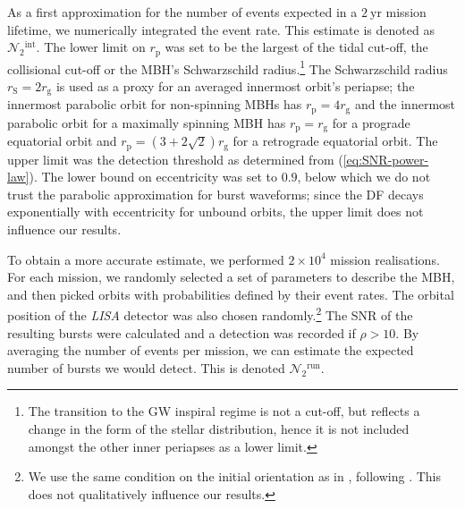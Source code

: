 \documentclass[useAMS,usedcolumn,usegraphicx,usenatbib]{mn2e}
\newcommand{\eqnref}[1]{(\ref{eq:#1})}
\newcommand{\units}[1]{\ensuremath{~\mathrm{#1}}}
\newcommand{\sub}[1]{\ensuremath{_\mathrm{#1}}}
\newcommand{\super}[1]{\ensuremath{^\mathrm{#1}}}
\begin{document}
As a first approximation for the number of events expected in a $2\units{yr}$ mission lifetime, we numerically integrated the event rate. This estimate is denoted as $\mathcal{N}_2\super{int}$. The lower limit on $r\sub{p}$ was set to be the largest of the tidal cut-off, the collisional cut-off or the MBH's Schwarzschild radius.\footnote{The transition to the GW inspiral regime is not a cut-off, but reflects a change in the form of the stellar distribution, hence it is not included amongst the other inner periapses as a lower limit.} The Schwarzschild radius $r\sub{S} = 2 r\sub{g}$ is used as a proxy for an averaged innermost orbit's periapse; the innermost parabolic orbit for non-spinning MBHs has $r\sub{p} = 4r\sub{g}$ and the innermost parabolic orbit for a maximally spinning MBH has $r\sub{p} = r\sub{g}$ for a prograde equatorial orbit and $r\sub{p} = (3 + 2\sqrt{2})r\sub{g}$ for a retrograde equatorial orbit. The upper limit was the detection threshold as determined from \eqnref{SNR-power-law}. The lower bound on eccentricity was set to $0.9$, below which we do not trust the parabolic approximation for burst waveforms; since the DF decays exponentially with eccentricity for unbound orbits, the upper limit does not influence our results.

To obtain a more accurate estimate, we performed $2 \times 10^4$ mission realisations. For each mission, we randomly selected a set of parameters to describe the MBH, and then picked orbits with probabilities defined by their event rates. The orbital position of the \textit{LISA} detector was also chosen randomly.\footnote{We use the same condition on the initial orientation as in \citet{Berry2013}, following \citet{Cutler1998}. This does not qualitatively influence our results.} The SNR of the resulting bursts were calculated and a detection was recorded if $\rho > 10$. By averaging the number of events per mission, we can estimate the expected number of bursts we would detect. This is denoted $\mathcal{N}_2\super{run}$.
\end{document}
